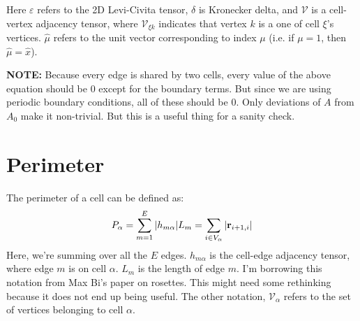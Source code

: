 \documentclass[12pt,a4paper]{article}
\begin{document}
Here $\varepsilon$ refers to the 2D Levi-Civita tensor, $\delta$ is Kronecker delta, and $\mathcal{V}$ is a cell-vertex adjacency tensor, where $\mathcal{V}_{\xi k}$ indicates that vertex $k$ is a one of cell $\xi$'s vertices. $\widehat{\mu}$ refers to the unit vector corresponding to index $\mu$ (i.e. if $\mu = 1$, then $\widehat{\mu} = \hat{x}$). 

\textbf{NOTE:} Because every edge is shared by two cells, every value of the above equation should be $0$ except for the boundary terms. But since we are using periodic boundary conditions, all of these should be $0$. Only deviations of $A$ from $A_0$ make it non-trivial. But this is a useful thing for a sanity check.

\section{Perimeter}
The perimeter of a cell can be defined as:
\begin{equation}
	\label{eqn: perim}
	P_\alpha = \sum\limits_{m=1}^{E} |h_{m\alpha}| L_m = \sum\limits_{i\in V_\alpha} |\vb{r}_{i+1,i}|
\end{equation}
Here, we're summing over all the $E$ edges. $h_{m\alpha}$ is the cell-edge adjacency tensor, where edge $m$ is on cell $\alpha$. $L_m$ is the length of edge $m$. I'm borrowing this notation from Max Bi's paper on rosettes. This might need some rethinking because it does not end up being useful. The other notation, $\mathcal{V}_\alpha$ refers to the set of vertices belonging to cell $\alpha$.
\end{document}
